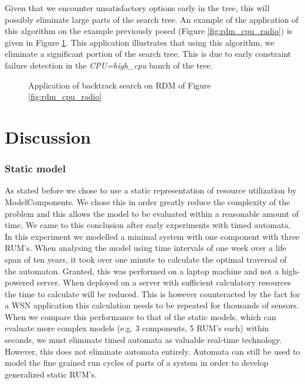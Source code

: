 Given that we encounter unsatisfactory options early in the tree, this will possibly eliminate large parts of the search tree. An example of the application of this algorithm on the example previously posed (Figure \ref{fig:rdm_cpu_radio}) is given in Figure \ref{fig:search_cpu_radio}. This application illustrates that using this algorithm, we eliminate a significant portion of the search tree. This is due to early constraint failure detection in the \emph{CPU=high\_cpu} banch of the tree.



\begin{figure}

\label{fig:search_cpu_radio}
\caption{Application of backtrack search on RDM of Figure \ref{fig:rdm_cpu_radio}}
\end{figure}


\section{Discussion}
\subsubsection{Static model}
As stated before we chose to use a static representation of resource utilization by ModelComponents. We chose this in order greatly reduce the complexity of the problem and this allows the model to be evaluated within a reasonable amount of time. We came to this conclusion after early experiments with timed automata. In this experiment we modelled a minimal system with one component with three RUM's. When analysing the model using time intervals of one week over a life span of ten years, it took over one minute to calculate the optimal traversal of the automaton. Granted, this was performed on a laptop machine and not a high-powered server. When deployed on a server with sufficient calculatory resources the time to calculate will be reduced. This is however counteracted by the fact for a WSN application this calculation needs to be repeated for thousands of sensors. When we compare this performance to that of the static models, which can evaluate more complex models (e.g. 3 components, 5 RUM's each) within seconds, we must eliminate timed automata as valuable real-time technology. However, this does not eliminate automata entirely. Automata can still be used to model the fine grained run cycles of parts of a system in order to develop generalized static RUM's.


